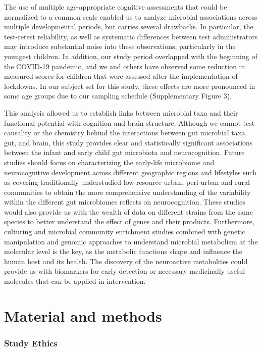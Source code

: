 \documentclass[a4paper]{article}
\begin{document}
The use of multiple age-appropriate cognitive assessments that could be
normalized to a common scale enabled us to analyze microbial
associations across multiple developmental periods, but carries several
drawbacks. In particular, the test-retest reliability, as well as
systematic differences between test administrators may introduce
substantial noise into these observations, particularly in the youngest
children. In addition, our study period overlapped with the beginning of
the COVID-19 pandemic, and we and others have observed some reduction in
measured scores for children that were assessed after the implementation
of lockdowns. In our subject set for this study, these effects are more
pronounced in some age groups due to our sampling schedule
\citep{blackwellYouthWellbeingCOVID192022,deoniImpactCOVID19Pandemic2021}
(Supplementary Figure 3).

This analysis allowed us to establish links between microbial taxa and
their functional potential with cognition and brain structure. Although
we cannot test causality or the chemistry behind the interactions
between gut microbial taxa, gut, and brain, this study provides clear
and statistically significant associations between the infant and early
child gut microbiota and neurocognition. Future studies should focus on
characterizing the early-life microbiome and neurocognitive development
across different geographic regions and lifestyles such as covering
traditionally understudied low-resource urban, peri-urban and rural
communities to obtain the more comprehensive understanding of the
variability within the different gut microbiomes reflects on
neurocognition. These studies would also provide us with the wealth of
data on different strains from the same species to better understand the
effect of genes and their products. Furthermore, culturing and microbial
community enrichment studies combined with genetic manipulation and
genomic approaches to understand microbial metabolism at the molecular
level is the key, as the metabolic functions shape and influence the
human host and its health. The discovery of the neuroactive metabolites
could provide us with biomarkers for early detection or necessary
medicinally useful molecules that can be applied in intervention.

\section*{Material and methods}

\subsubsection{Study Ethics}
\end{document}
